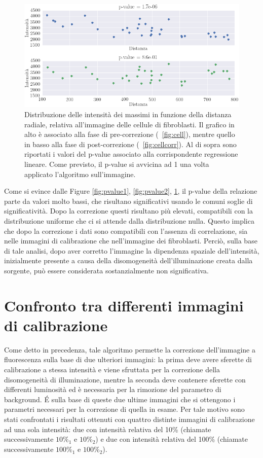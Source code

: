 \begin{figure}
 \centering
 \includegraphics[scale=.55]{img/CAP4pvalue3.png}
 \caption{\small{
 Distribuzione delle intensità dei massimi in funzione della distanza radiale, relativa all'immagine delle cellule di fibroblasti. Il grafico in alto è associato alla fase di pre-correzione (\figurename~\ref{fig:cell}), mentre quello in basso alla fase di post-correzione (\figurename~\ref{fig:cellcorr}). Al di sopra sono riportati i valori del p-value associato alla corrispondente regressione lineare. Come previsto, il p-value si avvicina ad 1 una volta applicato l'algoritmo sull'immagine.}}
 \label{fig:pvalue3}
\end{figure}

Come si evince dalle Figure \ref{fig:pvalue1}, \ref{fig:pvalue2}, \ref{fig:pvalue3}, il p-value della relazione parte da valori molto bassi, che risultano significativi usando le comuni soglie di significatività.
Dopo la correzione questi risultano più elevati, compatibili con la distribuzione uniforme che ci si attende dalla distribuzione nulla.
Questo implica che dopo la correzione i dati sono compatibili con l'assenza di correlazione, sia nelle immagini di calibrazione che nell'immagine dei fibroblasti. 
Perciò, sulla base di tale analisi, dopo aver corretto l'immagine la dipendenza spaziale dell'intensità, inizialmente presente a causa della disomogeneità dell'illuminazione creata dalla sorgente, può essere considerata sostanzialmente non significativa.


\section{Confronto tra differenti immagini di calibrazione}

Come detto in precedenza, tale algoritmo permette la correzione dell'immagine a fluorescenza sulla base di due ulteriori immagini: la prima deve avere sferette di calibrazione a stessa intensità e viene sfruttata per la correzione della disomogeneità di illuminazione, mentre la seconda deve contenere sferette con differenti luminosità ed è necessaria per la rimozione del parametro di background. 
\'E sulla base di queste due ultime immagini che si ottengono i parametri necessari per la correzione di quella in esame.
Per tale motivo sono stati confrontati i risultati ottenuti con quattro distinte immagini di calibrazione ad una sola intensità: due con intensità relativa del 10\% (chiamate successivamente $10\%_1$ e $10\%_2$) e due con intensità relativa del 100\% (chiamate successivamente $100\%_1$ e $100\%_2$).


